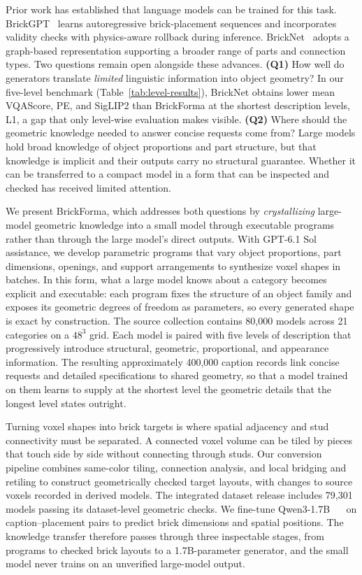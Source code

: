 Prior work has established that language models can be trained for this task. BrickGPT~\cite{brickgpt} learns autoregressive brick-placement sequences and incorporates validity checks with physics-aware rollback during inference. BrickNet~\cite{bricknet} adopts a graph-based representation supporting a broader range of parts and connection types. Two questions remain open alongside these advances. \textbf{(Q1)} How well do generators translate \emph{limited} linguistic information into object geometry? In our five-level benchmark (Table~\ref{tab:level-results}), BrickNet obtains lower mean VQAScore, PE, and SigLIP2 than BrickForma at the shortest description levels, L1, a gap that only level-wise evaluation makes visible. \textbf{(Q2)} Where should the geometric knowledge needed to answer concise requests come from? Large models hold broad knowledge of object proportions and part structure, but that knowledge is implicit and their outputs carry no structural guarantee. Whether it can be transferred to a compact model in a form that can be inspected and checked has received limited attention.

We present BrickForma, which addresses both questions by \emph{crystallizing} large-model geometric knowledge into a small model through executable programs rather than through the large model's direct outputs. With GPT-6.1 Sol assistance, we develop parametric programs that vary object proportions, part dimensions, openings, and support arrangements to synthesize voxel shapes in batches.
In this form, what a large model knows about a category becomes explicit and executable: each program fixes the structure of an object family and exposes its geometric degrees of freedom as parameters, so every generated shape is exact by construction. The source collection contains 80,000 models across 21 categories on a $48^3$ grid. Each model is paired with five levels of description that progressively introduce structural, geometric, proportional, and appearance information. The resulting approximately 400,000 caption records link concise requests and detailed specifications to shared geometry, so that a model trained on them learns to supply at the shortest level the geometric details that the longest level states outright.

Turning voxel shapes into brick targets is where spatial adjacency and stud connectivity must be separated. A connected voxel volume can be tiled by pieces that touch side by side without connecting through studs. Our conversion pipeline combines same-color tiling, connection analysis, and local bridging and retiling to construct geometrically checked target layouts, with changes to source voxels recorded in derived models. The integrated dataset release includes 79,301 models passing its dataset-level geometric checks. We fine-tune Qwen3-1.7B~\cite{qwen3} ~\cite{lora} on caption--placement pairs to predict brick dimensions and spatial positions. The knowledge transfer therefore passes through three inspectable stages, from programs to checked brick layouts to a 1.7B-parameter generator, and the small model never trains on an unverified large-model output.

